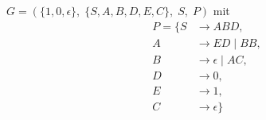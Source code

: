 \documentclass{article}
\begin{document}
$G=\left(\{1, 0, \epsilon\},\;\{ S, A, B, D, E, C\},\;S,\;P\right)
$ mit
\begin{align*}
P=\{	S &\rightarrow ABD, \\ 
	A &\rightarrow ED\;|\;BB, \\ 
	B &\rightarrow \epsilon\;|\;AC, \\ 
	D &\rightarrow 0, \\ 
	E &\rightarrow 1, \\ 
	C &\rightarrow \epsilon\}
\end{align*}
\end{document}
